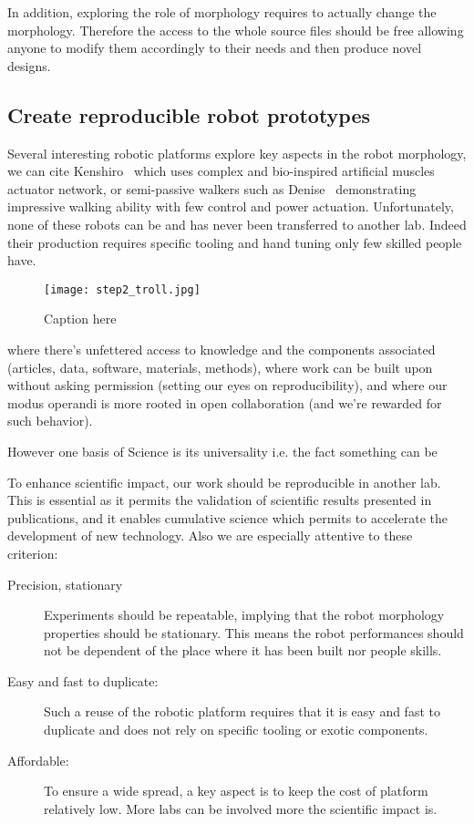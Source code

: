 In addition, exploring the role of morphology requires to actually change the morphology. Therefore the access to the whole source files should be free allowing anyone to modify them accordingly to their needs and then produce novel designs.

\subsection{Create reproducible robot prototypes} %

Several interesting robotic platforms explore key aspects in the robot morphology, we can cite Kenshiro~\cite{REF} which uses complex and bio-inspired artificial muscles actuator network, or semi-passive walkers such as Denise~\cite{REF} demonstrating impressive walking ability with few control and power actuation. Unfortunately, none of these robots can be and has never been transferred to another lab. Indeed their production requires specific tooling and hand tuning only few skilled people have.


\begin{figure}[tb]
    \begin{center}
        \texttt{[image: step2\_troll.jpg]}
    \end{center}
    \caption{Caption here}
    \label{fig:figure1}
\end{figure}

 where there’s unfettered access to knowledge and the components associated (articles, data, software, materials, methods), where work can be built upon without asking permission (setting our eyes on reproducibility), and where our modus operandi is more rooted in open collaboration (and we’re rewarded for such behavior).

However one basis of Science is its universality i.e. the fact something can be

To enhance scientific impact, our work should be reproducible in another lab. This is essential as it permits the validation of scientific results presented in publications, and it enables cumulative science which permits to accelerate the development of new technology. Also we are especially attentive to these criterion:

\begin{description}
    \item[Precision, stationary] Experiments should be repeatable, implying that the robot morphology properties should be stationary. This means the robot performances should not be dependent of the place where it has been built nor people skills.
    \item[Easy and fast to duplicate:] Such a reuse of the robotic platform requires that it is easy and fast to duplicate and does not rely on specific tooling or exotic components.
    \item[Affordable:] To ensure a wide spread, a key aspect is to keep the cost of platform relatively low. More labs can be involved more the scientific impact is.
\end{description}



